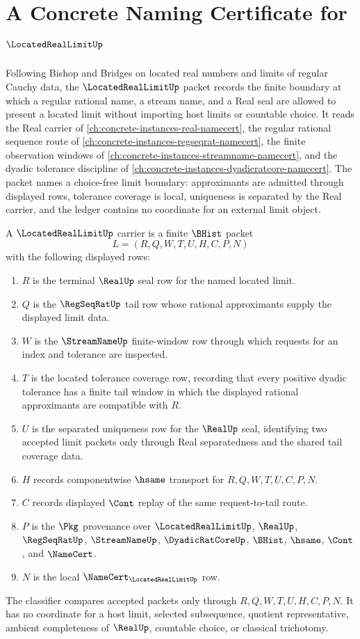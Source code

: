 \chapter{A Concrete Naming Certificate for $\LocatedRealLimitUp$}
\label{ch:concrete-instances-located-real-limit-namecert}

Following Bishop and Bridges on located real numbers and limits of regular Cauchy data, the $\LocatedRealLimitUp$ packet records the finite boundary at which a regular rational name, a stream name, and a Real seal are allowed to present a located limit without importing host limits or countable choice. It reads the Real carrier of \autoref{ch:concrete-instances-real-namecert}, the regular rational sequence route of \autoref{ch:concrete-instances-regseqrat-namecert}, the finite observation windows of \autoref{ch:concrete-instances-streamname-namecert}, and the dyadic tolerance discipline of \autoref{ch:concrete-instances-dyadicratcore-namecert}. The packet names a choice-free limit boundary: approximants are admitted through displayed rows, tolerance coverage is local, uniqueness is separated by the Real carrier, and the ledger contains no coordinate for an external limit object.

\begin{definition}
\label{def:located-real-limit-carrier}
A $\LocatedRealLimitUp$ carrier is a finite $\BHist$ packet
$$
L=(R,Q,W,T,U,H,C,P,N)
$$
with the following displayed rows:
\begin{enumerate}
\item $R$ is the terminal $\RealUp$ seal row for the named located limit.
\item $Q$ is the $\RegSeqRatUp$ tail row whose rational approximants supply the displayed limit data.
\item $W$ is the $\StreamNameUp$ finite-window row through which requests for an index and tolerance are inspected.
\item $T$ is the located tolerance coverage row, recording that every positive dyadic tolerance has a finite tail window in which the displayed rational approximants are compatible with $R$.
\item $U$ is the separated uniqueness row for the $\RealUp$ seal, identifying two accepted limit packets only through Real separatedness and the shared tail coverage data.
\item $H$ records componentwise $\hsame$ transport for $R,Q,W,T,U,C,P,N$.
\item $C$ records displayed $\Cont$ replay of the same request-to-tail route.
\item $P$ is the $\Pkg$ provenance over $\LocatedRealLimitUp$, $\RealUp$, $\RegSeqRatUp$, $\StreamNameUp$, $\DyadicRatCoreUp$, $\BHist$, $\hsame$, $\Cont$, and $\NameCert$.
\item $N$ is the local $\NameCert_{\LocatedRealLimitUp}$ row.
\end{enumerate}
The classifier compares accepted packets only through $R,Q,W,T,U,H,C,P,N$. It has no coordinate for a host limit, selected subsequence, quotient representative, ambient completeness of $\RealUp$, countable choice, or classical trichotomy.
\end{definition}

